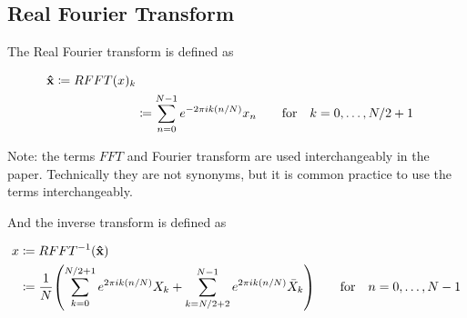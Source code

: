 \subsection*{Real Fourier Transform}

The Real Fourier transform is defined as

\begin{align*}
  \mathbf{\hat{x}} \coloneqq RFFT(x)_k\\
  & \coloneqq \sum_{n=0}^{N-1} e^{-2\pi i k (n/N)} x_n \qquad \text{for} \quad k = 0, \dotsc, N/2+1
\end{align*}

Note: the terms $FFT$ and Fourier transform are used interchangeably in the paper. Technically they are not synonyms, but it is common practice to use the terms interchangeably.

And the inverse transform is defined as

\begin{align*}
  x& \coloneqq RFFT^{-1}(\bhat{x})\\
  & \coloneqq \frac{1}{N} \paren{\sum_{k=0}^{N/2+1} e^{2\pi i k (n/N)} X_k + \sum_{k=N/2+2}^{N-1} e^{2\pi i k (n/N)} \bar{X}_k} \qquad \text{for} \quad n = 0, \dotsc, N-1
\end{align*}
